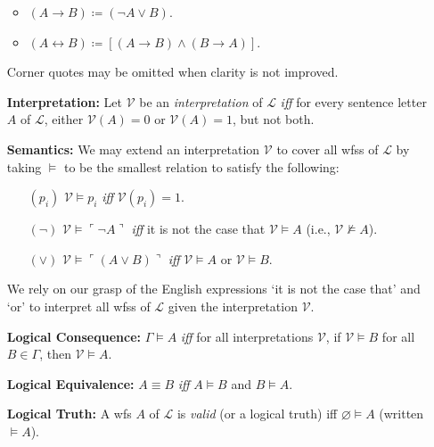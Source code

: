 \documentclass[a4paper, 11pt]{article} %
\newcommand{\corner}[1]{\ulcorner#1\urcorner} %
\newcommand{\V}[0]{\mathcal{V}}
\renewcommand{\L}[0]{\mathcal{L}}
\begin{document}
\begin{enumerate}[leftmargin=1.2in,labelsep=.15in]
\begin{itemize}
      \item $(A\rightarrow B) \coloneq (\neg A\vee B)$.
      \item $(A\leftrightarrow B) \coloneq [(A\rightarrow B)\wedge(B\rightarrow A)]$.
    \end{itemize}
    Corner quotes may be omitted when clarity is not improved.
  \item[\bf Interpretation:] Let $\V$ be an \textit{interpretation} of $\L$ \textit{iff} for every sentence letter $A$ of $\L$, either $\V(A)=0$ or $\V(A)=1$, but not both.
  \item[\bf Semantics:] We may extend an interpretation $\V$ to cover all wfss of $\L$ by taking $\vDash$ to be the smallest relation to satisfy the following:
  \begin{itemize}[leftmargin=.36in]\small
  \item[$(p_i)$] $\V\vDash p_i$ \textit{iff} $\V(p_i)=1$.
  \item[$(\neg)$] $\V\vDash \corner{\neg A}$ \textit{iff} it is not the case that $\V\vDash A$ (i.e., $\V\nvDash A$). %
  \item[$(\vee)$] $\V\vDash \corner{(A\vee B)}$ \textit{iff} $\V\vDash A$ or $\V\vDash B$.
  \end{itemize}
  We rely on our grasp of the English expressions `it is not the case that' and `or' to interpret all wfss of $\L$ given the interpretation $\V$. 
  \item[\bf Logical Consequence:] $\Gamma\vDash A$ \textit{iff} for all interpretations $\V$, if $\V\vDash B$ for all $B\in\Gamma$, then $\V\vDash A$.
  \item[\bf Logical Equivalence:] $A\equiv B$ \textit{iff} $A\vDash B$ and $B\vDash A$.  
  \item[\bf Logical Truth:] A wfs $A$ of $\L$ is \textit{valid} (or a logical truth) iff $\varnothing\vDash A$ (written $\vDash A$).
\end{enumerate}
\end{document}
